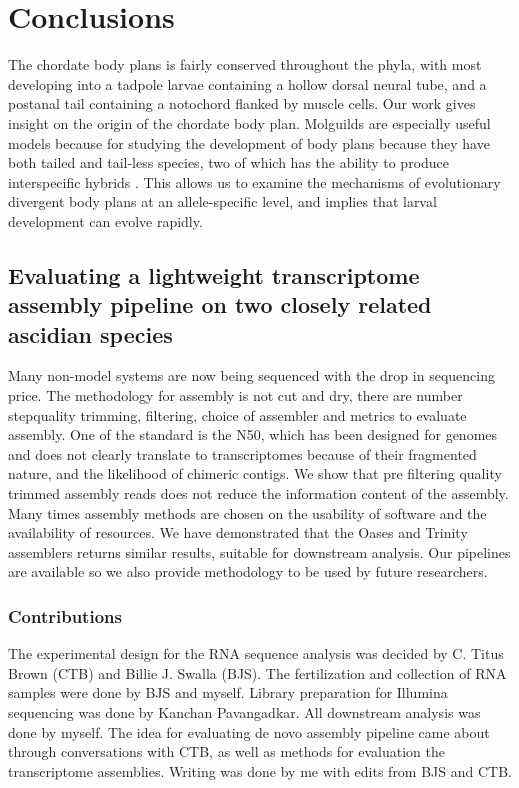 \chapter{Conclusions}
The chordate body plans is fairly conserved throughout the phyla, with most developing into a tadpole larvae containing a hollow dorsal neural tube, and a postanal tail containing a notochord flanked by muscle cells. Our work gives insight on the origin of the chordate body plan. Molguilds are especially useful models because for studying the development of body plans because they have both tailed and tail-less species, two of which has the ability to produce interspecific hybrids \cite{swalla_interspecific_1990}. This allows us to examine the mechanisms of evolutionary divergent body plans at an allele-specific level, and implies that larval development can evolve rapidly.  

\section{Evaluating a lightweight transcriptome assembly pipeline on two closely related ascidian species}
Many non-model systems are now being sequenced with the drop in sequencing price. The methodology for assembly is not cut and dry, there are number step\textemdash quality trimming, filtering, choice of assembler and metrics to evaluate assembly. One of the standard is the N50, which has been designed for genomes and does not clearly translate to transcriptomes because of their fragmented nature, and the likelihood of chimeric contigs. We show that pre filtering quality trimmed assembly reads does not reduce the information content of the assembly. Many times assembly methods are chosen on the usability of software and the availability of resources. We have demonstrated that the Oases and Trinity assemblers returns similar results, suitable for downstream analysis. Our pipelines are available so we also provide methodology to be used by future researchers. 

\subsection{Contributions}
The experimental design for the RNA sequence analysis was decided by C. Titus Brown (CTB) and Billie J. Swalla (BJS). The fertilization and collection of RNA samples were done by BJS and myself. Library preparation for Illumina sequencing was done by Kanchan Pavangadkar. All downstream analysis was done by myself. The idea for evaluating de novo assembly pipeline came about through conversations with CTB, as well as methods for evaluation the transcriptome assemblies. Writing was done by me with edits from BJS and CTB.

